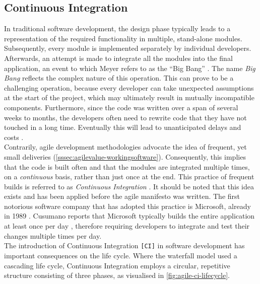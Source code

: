 
\subsection{Continuous Integration}
In traditional software development, the design phase typically leads to a representation of the required functionality in multiple, stand-alone modules. Subsequently, every module is implemented separately by individual developers. Afterwards, an attempt is made to integrate all the modules into the final application, an event to which Meyer refers to as the ``Big Bang'' \cite[~p.103]{Meyer2014}. The name \emph{Big Bang} reflects the complex nature of this operation. This can prove to be a challenging operation, because every developer can take unexpected assumptions at the start of the project, which may ultimately result in mutually incompatible components. Furthermore, since the code was written over a span of several weeks to months, the developers often need to rewrite code that they have not touched in a long time. Eventually this will lead to unanticipated delays and costs \cite{SmartJenkinsDefinitive}.\\ 

\noindent Contrarily, agile development methodologies advocate the idea of frequent, yet small deliveries (\autoref{sssec:agilevalue-workingsoftware}). Consequently, this implies that the code is built often and that the modules are integrated multiple times, on a \emph{continuous} basis, rather than just once at the end. This practice of frequent builds is referred to as \emph{Continuous Integration} \cite{martin2014,Meyer2014}. It should be noted that this idea exists and has been applied before the agile manifesto was written. The first notorious software company that has adopted this practice is Microsoft, already in 1989 \cite[~p.11]{cusumanomicrosoft}. Cusumano reports that Microsoft typically builds the entire application at least once per day \cite[~p.12]{cusumanomicrosoft}, therefore requiring developers to integrate and test their changes multiple times per day.\\

\noindent The introduction of Continuous Integration \texttt{[CI]} in software development has important consequences on the life cycle. Where the waterfall model used a cascading life cycle, Continuous Integration employs a circular, repetitive structure consisting of three phases, as visualised in \autoref{fig:agile-ci-lifecycle}.


